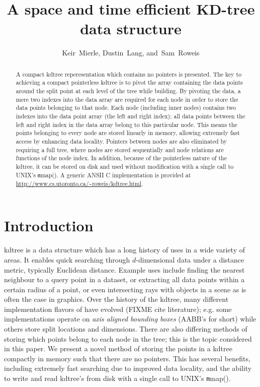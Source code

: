 \documentclass[journal]{IEEEtran}
\begin{document}
\title{A space and time efficient KD-tree data structure}
\author{Keir~Mierle,
        Dustin~Lang,
        and~Sam~Roweis}%
\maketitle

\begin{abstract}
A compact kdtree reperesentation which contains no pointers is presented. The
key to achieving a compact pointerless kdtree is to pivot the array containing
the data points around the split point at each level of the tree while
building. By pivoting the data, a mere two indexes into the data array are
required for each node in order to store the data points belonging to that
node.  Each node (including inner nodes) contains two indexes into the data
point array (the left and right index); all data points between the left and
right index in the data array belong to this particular node. This means the
points belonging to every node are stored linearly in memory, allowing
extremely fast access by enhancing data locality. Pointers between nodes are
also eliminated by requiring a full tree, where nodes are stored sequentially
and node relations are functions of the node index. In addition, because of the
pointerless nature of the kdtree, it can be stored on disk and used without
modification with a single call to UNIX's {\texttt mmap()}. A generic ANSII C
implementation is provided at \url{http://www.cs.utoronto.ca/~roweis/kdtree.html}.
\end{abstract}

\section{Introduction}
 kdtree is a data structure which has a long history of uses in a
wide variety of areas. It enables quick searching through $d$-dimensional data
under a distance metric, typically Euclidean distance.  Example uses
include finding the nearest neighbour to a query point in a dataset, or
extracting all data points within a certain radius of a point, or even
intersecting rays with objects in a scene as is often the case in graphics.
Over the history of the kdtree, many different implementation flavors of have
evolved (FIXME cite literature); e.g. some implementations operate on {\em axis
aligned bounding boxes} (AABB's for short) while others store split locations
and dimensions. There are also differing methods of storing which points belong
to each node in the tree; this is the topic considered in this paper. We
present a novel method of storing the points in a kdtree compactly in memory
such that there are no pointers. This has several benefits, including extremely
fast searching due to improved data locality, and the ability to write and read
kdtree's from disk with a single call to UNIX's {\texttt mmap()}.
\end{document}
